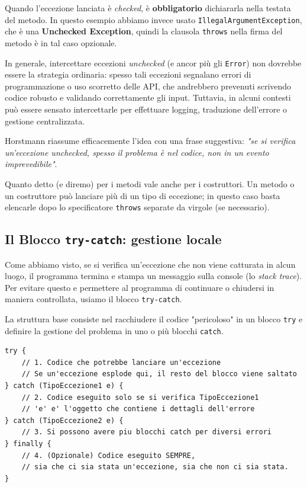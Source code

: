 \begin{tip}[]
Quando l'eccezione lanciata è \textit{checked}, è \textbf{obbligatorio} dichiararla nella testata del metodo. In questo esempio abbiamo invece usato \texttt{IllegalArgumentException}, che è una \textbf{Unchecked Exception}, quindi la clausola \texttt{throws} nella firma del metodo è in tal caso opzionale.

In generale, intercettare eccezioni \textit{unchecked} (e ancor più gli \texttt{Error}) non dovrebbe essere la strategia ordinaria: spesso tali eccezioni segnalano errori di programmazione o uso scorretto delle API, che andrebbero prevenuti scrivendo codice robusto e validando correttamente gli input. Tuttavia, in alcuni contesti può essere sensato intercettarle per effettuare logging, traduzione dell'errore o gestione centralizzata.

Horstmann riassume efficacemente l'idea con una frase suggestiva: \textit{"se si verifica un'eccezione unchecked, spesso il problema è nel codice, non in un evento imprevedibile"}.
\end{tip}



\begin{observation}
    Quanto detto (e diremo) per i metodi vale anche per i costruttori. Un metodo o un costruttore può lanciare più di un tipo di eccezione; in questo caso basta elencarle dopo lo specificatore \texttt{throws} separate da virgole (se necessario).
\end{observation}

\subsection{Il Blocco \texttt{try-catch}: gestione locale}

Come abbiamo visto, se si verifica un'eccezione che non viene catturata in alcun luogo, il programma termina e stampa un messaggio sulla console (lo \textit{stack trace}). Per evitare questo e permettere al programma di continuare o chiudersi in maniera controllata, usiamo il blocco \texttt{try-catch}.

La struttura base consiste nel racchiudere il codice "pericoloso" in un blocco \texttt{try} e definire la gestione del problema in uno o più blocchi \texttt{catch}.

\begin{lstlisting}[caption={Sintassi base try-catch-finally}]
try {
    // 1. Codice che potrebbe lanciare un'eccezione
    // Se un'eccezione esplode qui, il resto del blocco viene saltato
} catch (TipoEccezione1 e) {
    // 2. Codice eseguito solo se si verifica TipoEccezione1
    // 'e' e' l'oggetto che contiene i dettagli dell'errore
} catch (TipoEccezione2 e) {
    // 3. Si possono avere piu blocchi catch per diversi errori
} finally {
    // 4. (Opzionale) Codice eseguito SEMPRE, 
    // sia che ci sia stata un'eccezione, sia che non ci sia stata.
}
\end{lstlisting}


